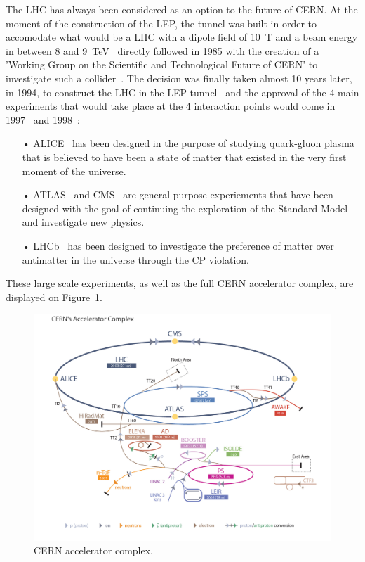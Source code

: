 	The LHC has always been considered as an option to the future of CERN. At the moment of the construction of the LEP, the tunnel was built in order to accomodate what would be a \acl{LHC} with a dipole field of \SI{10}{T} and a beam energy in between 8 and \SI{9}{TeV}~\cite{ANNUALREPORT1984} directly followed in 1985 with the creation of a 'Working Group on the Scientific and Technological Future of CERN' to investigate such a collider~\cite{ANNUALREPORT1985}. The decision was finally taken almost 10 years later, in 1994, to construct the LHC in the LEP tunnel~\cite{ANNUALREPORT1994} and the approval of the 4 main experiments that would take place at the 4 interaction points would come in 1997~\cite{ANNUALREPORT1997} and 1998~\cite{ANNUALREPORT1998}:
	
	\begin{itemize}
		\item[•] ALICE~\cite{ALICELOI} has been designed in the purpose of studying quark-gluon plasma that is believed to have been a state of matter that existed in the very first moment of the universe.
		\item[•] ATLAS~\cite{ATLASLOI} and CMS~\cite{CMSLOI} are general purpose experiements that have been designed with the goal of continuing the exploration of the Standard Model and investigate new physics.
		\item[•] LHCb~\cite{LHCBLOI} has been designed to investigate the preference of matter over antimatter in the universe through the CP violation.
	\end{itemize}
	
	These large scale experiments, as well as the full CERN accelerator complex, are displayed on Figure~\ref{fig:CERNComplex}.

	\begin{figure}[H]
		\centering
		\hspace*{-0.1\linewidth}
		\includegraphics[width=1.2\linewidth]{fig/chapt2/CERN_Accelerator_Complex.png}
		\caption{\label{fig:CERNComplex} CERN accelerator complex.}
	\end{figure}
	
